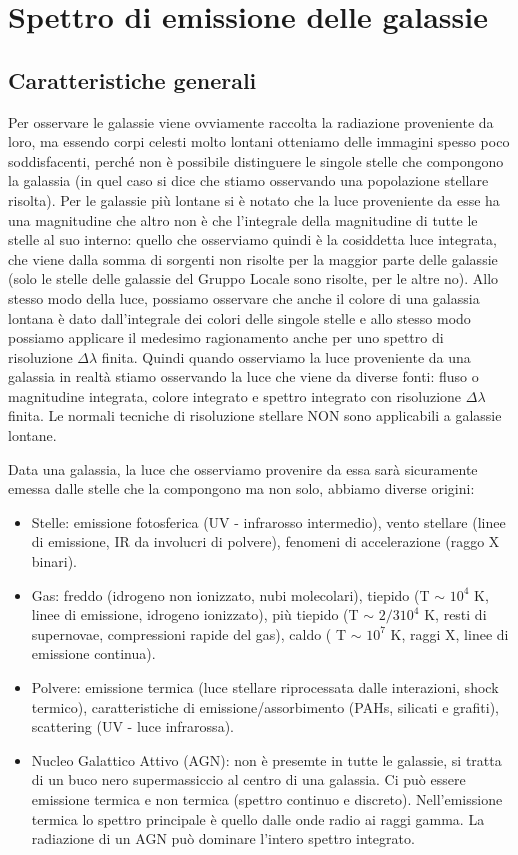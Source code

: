 \section{Spettro di emissione delle galassie}\label{sec:spettro-di-emissione-delle-galassie}
\subsection{Caratteristiche generali}
Per osservare le galassie viene ovviamente raccolta la radiazione proveniente da loro, ma essendo corpi celesti molto lontani otteniamo delle immagini spesso poco soddisfacenti, perché non è possibile distinguere le singole stelle che compongono la galassia (in quel caso si dice che stiamo osservando una popolazione stellare risolta). Per le galassie più lontane si è notato che la luce proveniente da esse ha una magnitudine che altro non è che l'integrale della magnitudine di tutte le stelle al suo interno: quello che osserviamo quindi è la cosiddetta luce integrata, che viene dalla somma di sorgenti non risolte per la maggior parte delle galassie (solo le stelle delle galassie del Gruppo Locale sono risolte, per le altre no). Allo stesso modo della luce, possiamo osservare che anche il colore di una galassia lontana è dato dall'integrale dei colori delle singole stelle e allo stesso modo possiamo applicare il medesimo ragionamento anche per uno spettro di risoluzione $\Delta\lambda$ finita. Quindi quando osserviamo la luce proveniente da una galassia in realtà stiamo osservando la luce che viene da diverse fonti: fluso o magnitudine integrata, colore integrato e spettro integrato con risoluzione $\Delta\lambda$ finita. Le normali tecniche di risoluzione stellare NON sono applicabili a galassie lontane.

Data una galassia, la luce che osserviamo provenire da essa sarà sicuramente emessa dalle stelle che la compongono ma non solo, abbiamo diverse origini:
\begin{itemize}
    \item Stelle: emissione fotosferica (UV - infrarosso intermedio), vento stellare (linee di emissione, IR da involucri di polvere), fenomeni di accelerazione (raggo X binari).
    \item Gas: freddo (idrogeno non ionizzato, nubi molecolari), tiepido (T $\sim$ $10^4$ K, linee di emissione, idrogeno ionizzato), più tiepido (T $\sim$ $2/3 10^4$ K, resti di supernovae, compressioni rapide del gas), caldo ( T $\sim$ $10^7$ K, raggi X, linee di emissione continua).
    \item Polvere: emissione termica (luce stellare riprocessata dalle interazioni, shock termico), caratteristiche di emissione/assorbimento (PAHs, silicati e grafiti), scattering (UV - luce infrarossa).
    \item Nucleo Galattico Attivo (AGN): non è presemte in tutte le galassie, si tratta di un buco nero supermassiccio al centro di una galassia. Ci può essere emissione termica e non termica (spettro continuo e discreto). Nell'emissione termica lo spettro principale è quello dalle onde radio ai raggi gamma. La radiazione di un AGN può dominare l'intero spettro integrato.
\end{itemize}

